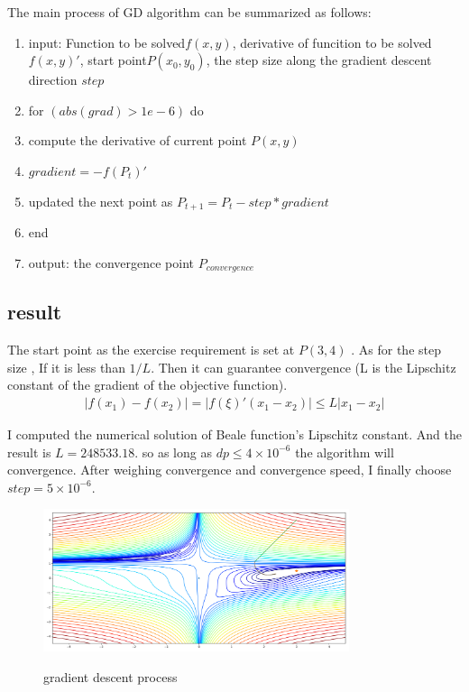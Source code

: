 \documentclass[aps,letterpaper,10pt]{article}
\begin{document}
The main process of GD algorithm can be summarized as follows:

\begin{enumerate}
	\item input: Function to be solved$f(x,y)$, derivative of funcition to be solved${f(x,y)}'$, start point$P(x_0,y_0)$, the step size along the gradient descent direction $step$
	\item for $(abs(grad)> 1e-6)$ do
	\item compute the derivative of current point $P(x,y)$
  \item $gradient = -{f(P_t)}'$
	\item updated the next point as $P_{t+1}=P_t - step*gradient$
  \item end
	\item output: the convergence point $P_{convergence}$
\end{enumerate}


\subsection{result}
The start point as the exercise requirement is set at $P(3,4)$ . As for the step size , If it is less than $1 / L$. Then it can guarantee convergence (L is the Lipschitz constant of the gradient of the objective function).
\begin{align*}
  |f(x_1)-f(x_2)| = |{f(\xi)}'(x_1-x_2)| \leq L|x_1-x_2|
\end{align*}

I computed the numerical solution of Beale function's Lipschitz constant. And the result is $L=248533.18$. so as long as $dp \leq4\times10^{-6} $ the algorithm will convergence. After weighing convergence and convergence speed, I finally choose $step = 5\times10^{-6} $.

	\begin{figure}[H]
	  \centering
	  \label{fig:gd}\includegraphics[width=0.8\textwidth]{gd.png}\
	  \caption{gradient descent process}
	\end{figure}
\end{document}
